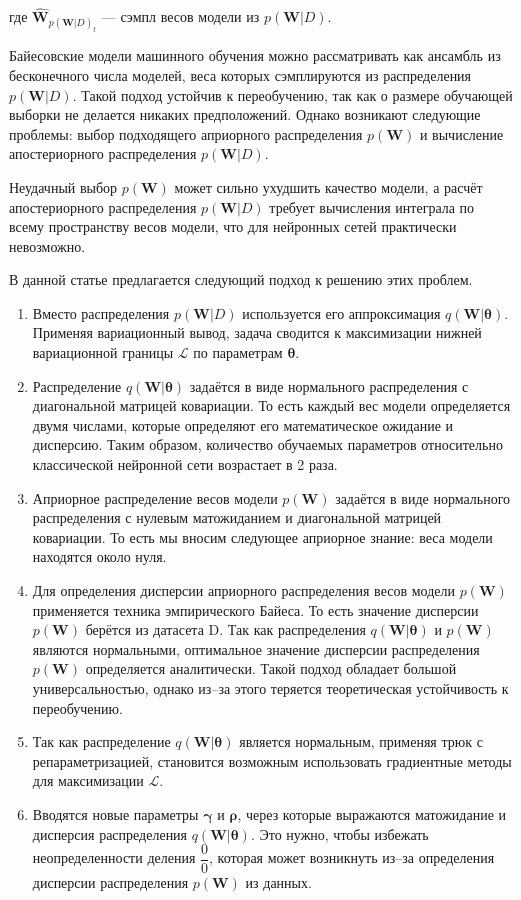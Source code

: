 \documentclass{article}
\begin{document}
где $\hat{\pmb{W}}_{p(\pmb{W} | D)_{t}}$ --- сэмпл весов модели из $p(\pmb{W}| D)$.

Байесовские модели машинного обучения можно рассматривать как ансамбль из бесконечного числа моделей, веса которых сэмплируются из распределения $p(\pmb{W}| D)$. Такой подход устойчив к переобучению, так как о размере обучающей выборки не делается никаких предположений. Однако возникают следующие проблемы: выбор подходящего априорного распределения $p(\pmb{W})$ и вычисление апостериорного распределения $p(\pmb{W}| D)$.

Неудачный выбор $p(\pmb{W})$ может сильно ухудшить качество модели, а расчёт апостериорного распределения $p(\pmb{W}| D)$ требует вычисления интеграла по всему пространству весов модели, что для нейронных сетей практически невозможно.

В данной статье предлагается следующий подход к решению этих проблем.

\begin{enumerate}
 \item Вместо распределения $p(\pmb{W}| D)$ используется его аппроксимация $q(\pmb{W} | \pmb{\theta})$. Применяя вариационный вывод, задача сводится к максимизации нижней вариационной границы $\mathcal{L}$ по параметрам $\pmb{\theta}$.
 \item Распределение $q(\pmb{W} | \pmb{\theta})$ задаётся в виде нормального распределения с диагональной матрицей ковариации. То есть каждый вес модели определяется двумя числами, которые определяют его математическое ожидание и дисперсию. Таким образом, количество обучаемых параметров относительно классической нейронной сети возрастает в 2 раза.
 \item Априорное распределение весов модели $p(\pmb{W})$ задаётся в виде нормального распределения с нулевым матожиданием и диагональной матрицей ковариации. То есть мы вносим следующее априорное знание: веса модели находятся около нуля.
 \item Для определения дисперсии априорного распределения весов модели $p(\pmb{W})$ применяется техника эмпирического Байеса. То есть значение дисперсии $p(\pmb{W})$ берётся из датасета D. Так как распределения $q(\pmb{W} | \pmb{\theta})$ и $p(\pmb{W})$ являются нормальными, оптимальное значение дисперсии распределения $p(\pmb{W})$ определяется аналитически. Такой подход обладает большой универсальностью, однако из--за этого теряется теоретическая устойчивость к переобучению.
 \item Так как распределение $q(\pmb{W} | \pmb{\theta})$ является нормальным, применяя трюк с репараметризацией, становится возможным использовать градиентные методы для максимизации $\mathcal{L}$.
 \item Вводятся новые параметры $\pmb{\gamma}$ и $\pmb{\rho}$, через которые выражаются матожидание и дисперсия распределения $q(\pmb{W} | \pmb{\theta})$. Это нужно, чтобы избежать неопределенности деления $\dfrac{0}{0}$, которая может возникнуть из--за определения дисперсии распределения $p(\pmb{W})$ из данных.
\end{enumerate}
\end{document}

